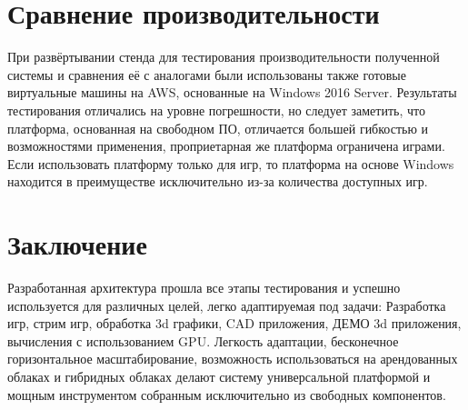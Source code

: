 \documentclass[10pt, a5paper]{article}
\begin{document}
\section*{Сравнение производительности}
При развёртывании стенда для тестирования производительности полученной системы и сравнения её с аналогами были использованы также готовые виртуальные машины на AWS, основанные на Windows 2016 Server. Результаты тестирования отличались на уровне погрешности, но следует заметить, что платформа, основанная на свободном ПО, отличается большей гибкостью и возможностями применения, проприетарная же платформа ограничена играми. Если использовать платформу только для игр, то платформа на основе Windows находится в преимуществе исключительно из-за количества доступных игр.

\section*{Заключение}
Разработанная архитектура прошла все этапы тестирования и успешно используется для различных целей, легко адаптируемая под задачи: Разработка игр, стрим игр, обработка 3d графики, CAD приложения, ДЕМО 3d приложения, вычисления с использованием GPU. 
Легкость адаптации, бесконечное горизонтальное масштабирование, возможность использоваться на арендованных облаках и гибридных облаках делают систему универсальной платформой и мощным инструментом собранным исключительно из свободных компонентов.
\end{document}
